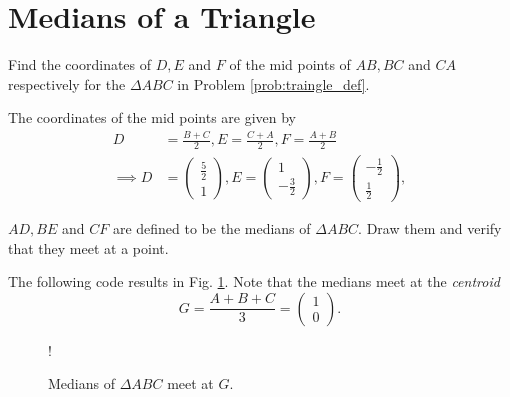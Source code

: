\documentclass[journal,12pt,twocolumn]{IEEEtran}
\begin{document}
\section{Medians of a Triangle}
\begin{problem}
Find the coordinates of $D, E$ and $F$ of the mid points of $AB, BC$ and $CA$ respectively for the $\Delta ABC$ in
Problem \ref{prob:traingle_def}.
\end{problem} The coordinates of the mid points are given by
%
\begin{align}
D &= \frac{B+C}{2}, E = \frac{C+A}{2}, F = \frac{A+B}{2}
\\
\implies D &= \begin{pmatrix}
\frac{5}{2}
\\
1
\end{pmatrix},
E = \begin{pmatrix}
1
\\
-\frac{3}{2}
\end{pmatrix},
F = \begin{pmatrix}
-\frac{1}{2}
\\
\frac{1}{2}
\end{pmatrix},
\end{align}
\begin{problem}
$AD, BE$ and $CF$ are defined to be the medians of $\Delta ABC$.  Draw them and verify that they meet at a point.
\end{problem}
\solution The following code results in Fig. \ref{fig:median_def}. Note that the medians meet at the {\em centroid} 
\begin{equation}
G = \frac{A+B+C}{3} = 
\begin{pmatrix}
1
\\
0
\end{pmatrix}.
\end{equation}

\begin{figure}[!h]
\centering
\resizebox {\columnwidth} {!} {

}
\caption{Medians of $\Delta ABC$ meet at $G$.}
\label{fig:median_def}
\end{figure}
\end{document}
